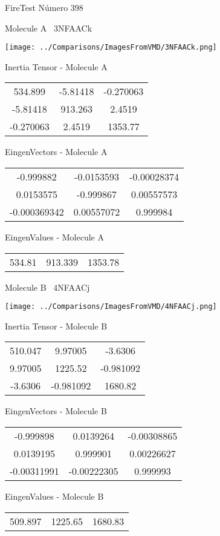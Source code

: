 \vtab[-3cm]
\begin{center}
{\large FireTest \tab Número 398}
\end{center}
\begin{multicols}{2}
\begin{center}

Molecule A \
3NFAACk

\texttt{[image: ../Comparisons/ImagesFromVMD/3NFAACk.png]}

Inertia Tensor - Molecule A \\
\begin{tabular}{|c c c|}
534.899	 & 	-5.81418	 & 	-0.270063	 \\
-5.81418	 & 	913.263	 & 	2.4519	 \\
-0.270063	 & 	2.4519	 & 	1353.77
\end{tabular}

\vtab
 EingenVectors - Molecule A     \\
\begin{tabular}{|c c c|}
-0.999882	 & 	-0.0153593	 & 	-0.00028374	 \\
0.0153575	 & 	-0.999867	 & 	0.00557573	 \\
-0.000369342	 & 	0.00557072	 & 	0.999984
\end{tabular}

\vtab
 EingenValues - Molecule A     \\
\begin{tabular}{|c c c|}
534.81	 & 	913.339	 & 	1353.78	 \\
\end{tabular}
\columnbreak

Molecule B \
4NFAACj

\texttt{[image: ../Comparisons/ImagesFromVMD/4NFAACj.png]}

Inertia Tensor - Molecule B \\
\begin{tabular}{|c c c|}
510.047	 & 	9.97005	 & 	-3.6306	 \\
9.97005	 & 	1225.52	 & 	-0.981092	 \\
-3.6306	 & 	-0.981092	 & 	1680.82
\end{tabular}

\vtab
 EingenVectors - Molecule B     \\
\begin{tabular}{|c c c|}
-0.999898	 & 	0.0139264	 & 	-0.00308865	 \\
0.0139195	 & 	0.999901	 & 	0.00226627	 \\
-0.00311991	 & 	-0.00222305	 & 	0.999993
\end{tabular}

\vtab
 EingenValues - Molecule B     \\
\begin{tabular}{|c c c|}
509.897	 & 	1225.65	 & 	1680.83	 \\
\end{tabular}

\end{center}
\end{multicols}

